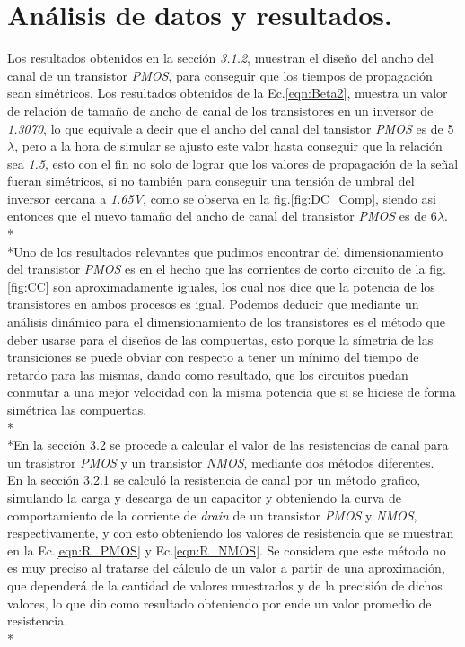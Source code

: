 \documentclass[12pt,a4paper]{article} %
\begin{document}
{\section{Análisis de datos y resultados.}

Los resultados obtenidos en la sección \textit{3.1.2}, muestran el diseño del ancho del canal de un transistor \textit{PMOS}, para conseguir que los tiempos de propagación sean simétricos. Los resultados obtenidos de la Ec.\ref{eqn:Beta2}, muestra un valor de relación de tamaño de ancho de canal de los transistores en un inversor de \textit{1.3070}, lo que equivale a decir que el ancho del canal del tansistor \textit{PMOS} es de 5$\lambda$, pero a la hora de simular se ajusto este valor hasta conseguir que la relación sea \textit{1.5}, esto con el fin no solo de lograr que los valores de propagación de la señal fueran simétricos, si no también para conseguir una tensión de umbral del inversor cercana a \textit{1.65V}, como se observa en la fig.\ref{fig:DC_Comp}, siendo asi entonces que el nuevo tamaño del ancho de canal del transistor \textit{PMOS} es de 6$\lambda$.\\*
\\*Uno de los resultados relevantes que pudimos encontrar del dimensionamiento del transistor \textit{PMOS} es en el hecho que las corrientes de corto circuito de la fig. \ref{fig:CC} son aproximadamente iguales, los cual nos dice que la potencia de los transistores en ambos procesos es igual. Podemos deducir que mediante un análisis dinámico para el dimensionamiento de los transistores es el método que deber usarse para el diseños de las compuertas, esto porque la símetría de las transiciones se puede obviar con respecto a tener un mínimo del tiempo de retardo para las mismas, dando como resultado, que los circuitos puedan conmutar a una mejor velocidad con la misma potencia que si se hiciese de forma simétrica las compuertas.\\*
\\*En la sección 3.2 se procede a calcular el valor de las resistencias de canal para un trasistror \textit{PMOS} y un transistor \textit{NMOS}, mediante dos métodos diferentes. \\

En la sección 3.2.1 se calculó la resistencia de canal por un método grafico, simulando la carga y descarga de un capacitor y obteniendo la curva de comportamiento de la corriente de \textit{drain} de un transistor \textit{PMOS} y \textit{NMOS}, respectivamente, y con esto obteniendo los valores de resistencia que se muestran en la Ec.\ref{eqn:R_PMOS} y Ec.\ref{eqn:R_NMOS}. Se considera que este método no es muy preciso al tratarse del cálculo de un valor a partir de una aproximación, que dependerá de la cantidad de valores muestrados y de la precisión de dichos valores, lo que dio como resultado obteniendo por ende un valor promedio de resistencia.\\*

}
\end{document}
